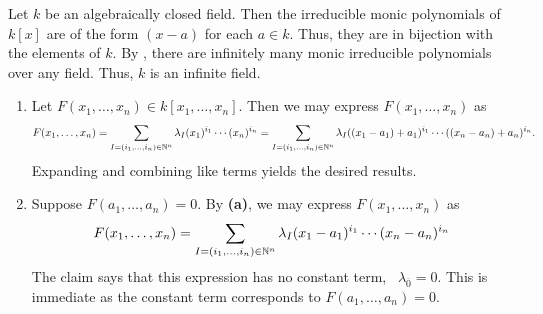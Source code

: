 \documentclass[letterpaper, 11pt, oneside]{book}
\begin{document}
\clearpage

\begin{sol}\label{ex:Curves_1.6}
  Let $k$ be an algebraically closed field.
  Then the irreducible monic polynomials of $k[x]$ are of the form $(x - a)$ for each $a \in k$.
  Thus, they are in bijection with the elements of $k$.
  By \mbox{}, there are infinitely many monic irreducible polynomials over any field.
  Thus, $k$ is an infinite field.
\end{sol}

\begin{sol}\label{ex:Curves_1.7}
  \begin{enumerate}[label= (\alph*)]
    \item Let $F(x_{1}, \ldots, x_{n}) \in k[x_{1}, \ldots, x_{n}]$.
          Then we may express $F(x_{1}, \ldots, x_{n})$ as
          \[
            F(x_{1}, \ldots, x_{n}) = \sum_{I = (i_{1}, \ldots, i_{n}) \in \mathbb{N} ^{n}} \lambda_{I} (x_{1})^{i_{1}} \cdots (x_{n})^{i_{n}} = \sum_{I = (i_{1}, \ldots, i_{n}) \in \mathbb{N} ^{n}} \lambda_{I} ((x_{1} - a_{1}) + a_{1})^{i_{1}} \cdots ((x_{n} - a_{n}) + a_{n})^{i_{n}}.
          \]
          Expanding and combining like terms yields the desired results.
    \item Suppose $F(a_{1}, \ldots, a_{n}) = 0$.
          By \textbf{(a)}, we may express $F(x_{1}, \ldots, x_{n})$ as
          \[
            F(x_{1}, \ldots, x_{n}) = \sum_{I = (i_{1}, \ldots, i_{n}) \in \mathbb{N} ^{n}} \lambda_{I} (x_{1} - a_{1})^{i_{1}} \cdots (x_{n} - a_{n})^{i_{n}}
          \]
          The claim says that this expression has no constant term, \ie\ $\lambda_{\overline{0}} = 0$.
          This is immediate as the constant term corresponds to $F(a_{1}, \ldots, a_{n}) = 0$.
  \end{enumerate}
\end{sol}



\printbibliography
\end{document}
